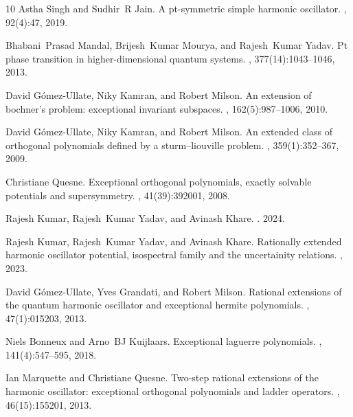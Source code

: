 \documentclass[a4paper, 12pt]{article}
\begin{document}
\begin{thebibliography}{10}
  Astha Singh and Sudhir~R Jain.
  \newblock A pt-symmetric simple harmonic oscillator.
  , 92(4):47, 2019.
  
  Bhabani~Prasad Mandal, Brijesh~Kumar Mourya, and Rajesh~Kumar Yadav.
  \newblock Pt phase transition in higher-dimensional quantum systems.
  , 377(14):1043--1046, 2013.
  
  David G{\'o}mez-Ullate, Niky Kamran, and Robert Milson.
  \newblock An extension of bochner’s problem: exceptional invariant subspaces.
  , 162(5):987--1006, 2010.
  
  David G{\'o}mez-Ullate, Niky Kamran, and Robert Milson.
  \newblock An extended class of orthogonal polynomials defined by a
    sturm--liouville problem.
  ,
    359(1):352--367, 2009.
  
  Christiane Quesne.
  \newblock Exceptional orthogonal polynomials, exactly solvable potentials and
    supersymmetry.
  ,
    41(39):392001, 2008.
  
  Rajesh Kumar, Rajesh~Kumar Yadav, and Avinash Khare.
  .
   2024.
  
  Rajesh Kumar, Rajesh~Kumar Yadav, and Avinash Khare.
  \newblock Rationally extended harmonic oscillator potential, isospectral family
    and the uncertainity relations.
  , 2023.
  
  David G{\'o}mez-Ullate, Yves Grandati, and Robert Milson.
  \newblock Rational extensions of the quantum harmonic oscillator and
    exceptional hermite polynomials.
  ,
    47(1):015203, 2013.
  
  Niels Bonneux and Arno~BJ Kuijlaars.
  \newblock Exceptional laguerre polynomials.
  , 141(4):547--595, 2018.
  
  Ian Marquette and Christiane Quesne.
  \newblock Two-step rational extensions of the harmonic oscillator: exceptional
    orthogonal polynomials and ladder operators.
  ,
    46(15):155201, 2013.
  

\end{thebibliography}
\end{document}
